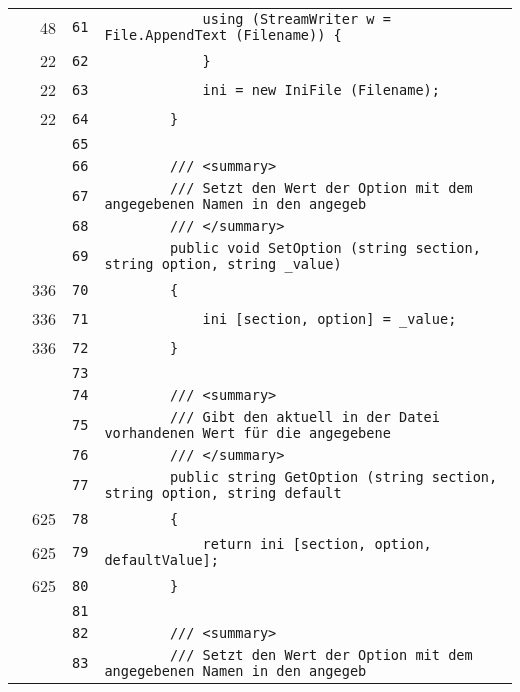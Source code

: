 \documentclass[a4paper,10pt]{article}
\begin{document}
\begin{longtable}[l]{lrrl}
\cellcolor{green} & 48 & \verb~61~ & \verb~            using (StreamWriter w = File.AppendText (Filename)) {~\\
\cellcolor{green} & 22 & \verb~62~ & \verb~            }~\\
\cellcolor{green} & 22 & \verb~63~ & \verb~            ini = new IniFile (Filename);~\\
\cellcolor{green} & 22 & \verb~64~ & \verb~        }~\\
\cellcolor{gray} &  & \verb~65~ & \verb~~\\
\cellcolor{gray} &  & \verb~66~ & \verb~        /// <summary>~\\
\cellcolor{gray} &  & \verb~67~ & \verb~        /// Setzt den Wert der Option mit dem angegebenen Namen in den angegeb~\\
\cellcolor{gray} &  & \verb~68~ & \verb~        /// </summary>~\\
\cellcolor{gray} &  & \verb~69~ & \verb~        public void SetOption (string section, string option, string _value)~\\
\cellcolor{green} & 336 & \verb~70~ & \verb~        {~\\
\cellcolor{green} & 336 & \verb~71~ & \verb~            ini [section, option] = _value;~\\
\cellcolor{green} & 336 & \verb~72~ & \verb~        }~\\
\cellcolor{gray} &  & \verb~73~ & \verb~~\\
\cellcolor{gray} &  & \verb~74~ & \verb~        /// <summary>~\\
\cellcolor{gray} &  & \verb~75~ & \verb~        /// Gibt den aktuell in der Datei vorhandenen Wert für die angegebene ~\\
\cellcolor{gray} &  & \verb~76~ & \verb~        /// </summary>~\\
\cellcolor{gray} &  & \verb~77~ & \verb~        public string GetOption (string section, string option, string default~\\
\cellcolor{green} & 625 & \verb~78~ & \verb~        {~\\
\cellcolor{green} & 625 & \verb~79~ & \verb~            return ini [section, option, defaultValue];~\\
\cellcolor{green} & 625 & \verb~80~ & \verb~        }~\\
\cellcolor{gray} &  & \verb~81~ & \verb~~\\
\cellcolor{gray} &  & \verb~82~ & \verb~        /// <summary>~\\
\cellcolor{gray} &  & \verb~83~ & \verb~        /// Setzt den Wert der Option mit dem angegebenen Namen in den angegeb~\\

\end{longtable}
\end{document}
